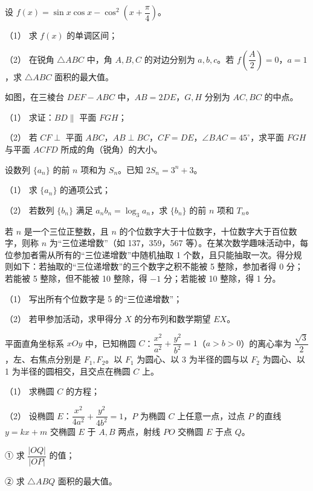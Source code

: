 \begin{question}

设 $f(x)=\sin x\cos x-\cos^2\left(x+\dfrac{\pi}{4}\right)$。

（1） 求 $f(x)$ 的单调区间；

（2） 在锐角 $\triangle ABC$ 中，角 $A,B,C$ 的对边分别为 $a,b,c$。若 $f\left(\dfrac{A}{2}\right)=0$，$a=1$，求 $\triangle ABC$ 面积的最大值。

\Needspace{0.4\textheight}
\end{question}
\begin{question}

如图，在三棱台 $DEF-ABC$ 中，$AB=2DE$，$G,H$ 分别为 $AC,BC$ 的中点。
\nopagebreak[4]
\begin{center}\end{center}
\nopagebreak[4]
（1） 求证：$BD\parallel$ 平面 $FGH$；

（2） 若 $CF\perp$ 平面 $ABC$，$AB\perp BC$，$CF=DE$，$\angle BAC=45^\circ$，求平面 $FGH$ 与平面 $ACFD$ 所成的角（锐角）的大小。

\end{question}
\begin{question}

设数列 $\{a_n\}$ 的前 $n$ 项和为 $S_n$。已知 $2S_n=3^n+3$。

（1） 求 $\{a_n\}$ 的通项公式；

（2） 若数列 $\{b_n\}$ 满足 $a_nb_n=\log_3 a_n$，求 $\{b_n\}$ 的前 $n$ 项和 $T_n$。

\end{question}
\begin{question}

若 $n$ 是一个三位正整数，且 $n$ 的个位数字大于十位数字，十位数字大于百位数字，则称 $n$ 为“三位递增数”（如 137，359，567 等）。在某次数学趣味活动中，每位参加者需从所有的“三位递增数”中随机抽取 1 个数，且只能抽取一次。得分规则如下：若抽取的“三位递增数”的三个数字之积不能被 5 整除，参加者得 0 分；若能被 5 整除，但不能被 10 整除，得 $-1$ 分；若能被 10 整除，得 1 分。

（1） 写出所有个位数字是 5 的“三位递增数”；

（2） 若甲参加活动，求甲得分 $X$ 的分布列和数学期望 $EX$。

\end{question}
\begin{question}

平面直角坐标系 $xOy$ 中，已知椭圆 $C$：$\dfrac{x^2}{a^2}+\dfrac{y^2}{b^2}=1$（$a>b>0$）的离心率为 $\dfrac{\sqrt{3}}{2}$，左、右焦点分别是 $F_1,F_2$。以 $F_1$ 为圆心、以 3 为半径的圆与以 $F_2$ 为圆心、以 1 为半径的圆相交，且交点在椭圆 $C$ 上。

（1） 求椭圆 $C$ 的方程；

（2） 设椭圆 $E$：$\dfrac{x^2}{4a^2}+\dfrac{y^2}{4b^2}=1$，$P$ 为椭圆 $C$ 上任意一点，过点 $P$ 的直线 $y=kx+m$ 交椭圆 $E$ 于 $A,B$ 两点，射线 $PO$ 交椭圆 $E$ 于点 $Q$。

① 求 $\dfrac{|OQ|}{|OP|}$ 的值；

② 求 $\triangle ABQ$ 面积的最大值。

\end{question}
